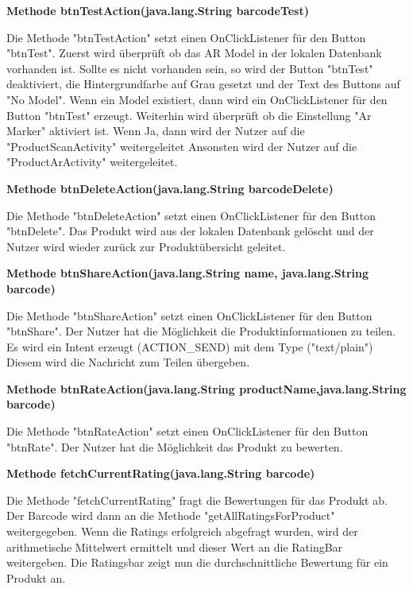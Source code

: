 \documentclass{scrartcl}
\begin{document}
\noindent\textbf{Methode btnTestAction(java.lang.String barcodeTest)} 

\noindent Die Methode "btnTestAction" setzt einen OnClickListener für den Button "btnTest". Zuerst wird überprüft ob das AR Model in der lokalen Datenbank vorhanden ist. Sollte es nicht vorhanden sein, so wird der Button "btnTest" deaktiviert, die Hintergrundfarbe auf Grau gesetzt und der Text des Buttons auf "No Model". Wenn ein Model existiert, dann wird ein OnClickListener für den Button "btnTest" erzeugt. Weiterhin wird überprüft ob die Einstellung "Ar Marker" aktiviert ist. Wenn Ja, dann wird der Nutzer auf die "ProductScanActivity" weitergeleitet Ansonsten wird der Nutzer auf die "ProductArActivity" weitergeleitet. \newline

\noindent\textbf{Methode btnDeleteAction(java.lang.String barcodeDelete)} 

\noindent Die Methode "btnDeleteAction" setzt einen OnClickListener für den Button "btnDelete". Das Produkt wird aus der lokalen Datenbank gelöscht und der Nutzer wird wieder zurück zur Produktübersicht geleitet. \newline

\noindent\textbf{Methode btnShareAction(java.lang.String name, java.lang.String barcode)} 

\noindent Die Methode "btnShareAction" setzt einen OnClickListener für den Button "btnShare". Der Nutzer hat die Möglichkeit die Produktinformationen zu teilen. Es wird ein Intent erzeugt (ACTION\_SEND) mit dem Type ("text/plain") Diesem wird die Nachricht zum Teilen übergeben. \newline 

\noindent\textbf{Methode btnRateAction(java.lang.String productName,\newline               java.lang.String barcode)} 

\noindent Die Methode "btnRateAction" setzt einen OnClickListener für den Button "btnRate". Der Nutzer hat die Möglichkeit das Produkt zu bewerten. \newline 

\noindent\textbf{Methode fetchCurrentRating(java.lang.String barcode)} 

\noindent Die Methode "fetchCurrentRating" fragt die Bewertungen für das Produkt ab. Der Barcode wird dann an die Methode "getAllRatingsForProduct" weitergegeben. Wenn die Ratings erfolgreich abgefragt wurden, wird der arithmetische Mittelwert ermittelt und dieser Wert an die RatingBar weitergeben. Die Ratingsbar zeigt nun die durchschnittliche Bewertung für ein Produkt an. \newline 
\end{document}
